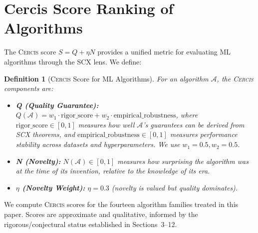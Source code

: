 \documentclass[12pt,a4paper]{article}
\newtheorem{definition}[theorem]{Definition}
\theoremstyle{definition}
\newcommand{\Cercis}{\textsc{Cercis}}
\newcommand{\SCX}{\textsc{SCX}}
\newcommand{\cA}{\mathcal{A}}
\begin{document}
\section{Cercis Score Ranking of Algorithms}
\label{sec:cercis}

The \Cercis{} score $S = Q + \eta N$ provides a unified metric for evaluating ML algorithms through the \SCX{} lens. We define:

\begin{definition}[\Cercis{} Score for ML Algorithms]\label{def:cercis_ml}
For an algorithm $\cA$, the \Cercis{} components are:
\begin{itemize}[nosep]
    \item \textbf{Q (Quality Guarantee):} $Q(\cA) = w_1 \cdot \text{rigor\_score} + w_2 \cdot \text{empirical\_robustness}$, where $\text{rigor\_score} \in [0,1]$ measures how well $\cA$'s guarantees can be derived from \SCX{} theorems, and $\text{empirical\_robustness} \in [0,1]$ measures performance stability across datasets and hyperparameters. We use $w_1 = 0.5, w_2 = 0.5$.
    \item \textbf{N (Novelty):} $N(\cA) \in [0,1]$ measures how surprising the algorithm was at the time of its invention, relative to the knowledge of its era.
    \item \textbf{$\eta$ (Novelty Weight):} $\eta = 0.3$ (novelty is valued but quality dominates).
\end{itemize}
\end{definition}

We compute \Cercis{} scores for the fourteen algorithm families treated in this paper. Scores are approximate and qualitative, informed by the rigorous/conjectural status established in Sections~3--12.
\end{document}
